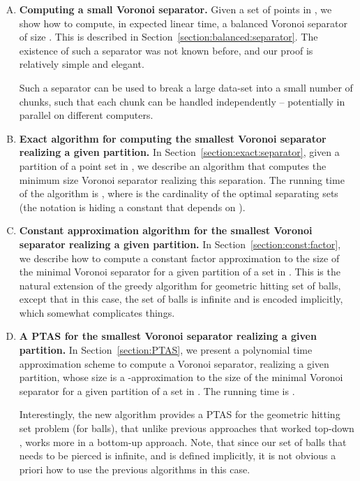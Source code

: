 \InSubmitVer{\documentclass[11pt]{article}}
\numberwithin{figure}{section}
\numberwithin{table}{section}
\numberwithin{equation}{section}
\newcommand{\secref}[1]{Section~\ref{section:#1}}
\newcommand{\Term}[1]{\textsf{#1}}
\newcommand{\PTAS}{\Term{PTAS}\xspace}
\begin{document}
\begin{enumerate}[(A)]\item \textbf{Computing a small Voronoi separator.} Given a set  of  points in , we show how to
    compute, in expected linear time, a balanced Voronoi separator of
    size . This is described in
    \secref{balanced:separator}. The existence of such a separator was
    not known before, and our proof is relatively simple and elegant.
    
    Such a separator can be used to break a large data-set into a
    small number of chunks, such that each chunk can be handled
    independently -- potentially in parallel on different computers.

    \item \textbf{Exact algorithm for computing the smallest Voronoi
       separator realizing a given partition.} In \secref{exact:separator}, given a partition  of a point set  in , we describe an
    algorithm that computes the minimum size Voronoi separator
    realizing this separation.  The running time of the algorithm is
    , where  is the cardinality of
    the optimal separating sets (the  notation is hiding a constant
    that depends on ).
    
    
    \item \textbf{Constant approximation algorithm for the smallest
       Voronoi separator realizing a given partition.} In \secref{const:factor}, we describe how to compute a constant
    factor approximation to the size of the minimal Voronoi separator
    for a given partition of a set in . This is the natural
    extension of the greedy algorithm for geometric hitting set of
    balls, except that in this case, the set of balls is infinite and
    is encoded implicitly, which somewhat complicates things.
    
    
    \item \textbf{A \PTAS for the smallest Voronoi separator realizing
       a given partition.} In \secref{PTAS}, we present a polynomial time approximation
    scheme to compute a Voronoi separator, realizing a given
    partition, whose size is a -approximation to the size of
    the minimal Voronoi separator for a given partition of a set in
    . The running time is .
    
    Interestingly, the new algorithm provides a \PTAS for the
    geometric hitting set problem (for balls), that unlike previous
    approaches that worked top-down \cite{c-ptasp-03, ejs-ptasg-05},
    works more in a bottom-up approach. Note, that since our set of
    balls that needs to be pierced is infinite, and is defined
    implicitly, it is not obvious a priori how to use the previous
    algorithms in this case. 



\end{enumerate}
\end{document}

